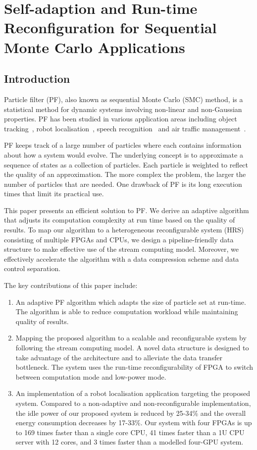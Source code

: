 
\chapter[Self-adaption \& Run-time Reconfiguration for SMC Applications]{Self-adaption and Run-time Reconfiguration for Sequential Monte Carlo Applications}

\section{Introduction}

Particle filter (PF), also known as sequential Monte Carlo (SMC) method, is a statistical method for dynamic systems involving non-linear and non-Gaussian properties. 
PF has been studied in various application areas including object tracking~\cite{happe11}, robot localisation~\cite{montemerlo02}, speech recognition~\cite{vermaak02} and air traffic management~\cite{eele11}.

PF keeps track of a large number of particles where each contains information about how a system would evolve.
The underlying concept is to approximate a sequence of states as a collection of particles.
Each particle is weighted to reflect the quality of an approximation.
The more complex the problem, the larger the number of particles that are needed.
One drawback of PF is its long execution times that limit its practical use.

This paper presents an efficient solution to PF.
We derive an adaptive algorithm that adjusts its computation complexity at run time based on the quality of results.
To map our algorithm to a heterogeneous reconfigurable system (HRS) consisting of multiple FPGAs and CPUs,
we design a pipeline-friendly data structure to make effective use of the stream computing model.
Moreover, we effectively accelerate the algorithm with a data compression scheme and data control separation.

The key contributions of this paper include:

\begin{enumerate}
\item An adaptive PF algorithm which adapts the size of particle set at run-time. 
The algorithm is able to reduce computation workload while maintaining quality of results.
\item Mapping the proposed algorithm to a scalable and reconfigurable system by following the stream computing model.
A novel data structure is designed to take advantage of the architecture and to alleviate the data transfer bottleneck.
The system uses the run-time reconfigurability of FPGA to switch between computation mode and low-power mode.
\item An implementation of a robot localisation application targeting the proposed system. 
Compared to a non-adaptive and non-reconfigurable implementation, the idle power of our proposed system is reduced by 25-34\% and the overall energy consumption decreases by 17-33\%.
Our system with four FPGAs is up to 169 times faster than a single core CPU, 41 times faster than a 1U CPU server with 12 cores, and 3 times faster than a modelled four-GPU system.
\end{enumerate}

